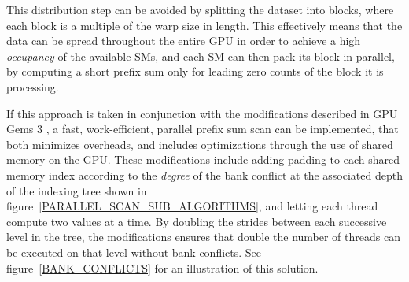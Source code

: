  This distribution step can be avoided by splitting the dataset into blocks, where each block is a multiple of the warp size in length. This effectively means that the data can be
 spread throughout the entire GPU in order to achieve a high \textit{occupancy} of the available SMs, and each SM can then pack its block in parallel, by computing a short prefix sum only for leading zero counts 
 of the block it is processing. 
 
 If this approach is taken in conjunction with the modifications described in GPU Gems 3 \cite{harris2007parallel}, a fast, work-efficient, parallel prefix sum scan can be implemented, that both minimizes overheads, and 
 includes optimizations through the use of shared memory on the GPU. These modifications include adding padding  to each shared memory index according to the \textit{degree} of the bank conflict at the associated 
 depth of the indexing tree shown in figure~\ref{PARALLEL_SCAN_SUB_ALGORITHMS}, and letting each thread compute two values at a time. By doubling the strides between each successive level in the tree, the modifications 
 ensures that double the number of threads can be executed on that level without bank conflicts. See figure~\ref{BANK_CONFLICTS} for an illustration of this solution.
